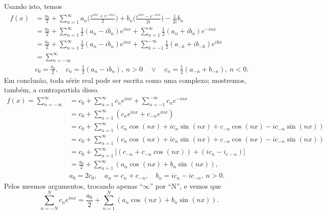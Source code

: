 \documentclass[../pde_notes.tex]{subfiles}
\begin{document}
Usando isto, temos
\begin{align*}
	f(x) & = \frac{a_{0}}{2} + \sum\limits_{n=1}^{\infty}a_{n}\biggl(\frac{e^{inx}+e^{-inx}}{2}\biggr) + b_{n}\biggl(\frac{e^{inx}-e^{-inx}}{2i}\biggr) - \frac{1}{2i}b_{n} \\
	     & = \frac{a_{0}}{2} + \sum\limits_{n=1}^{\infty}\frac{1}{2}(a_{n}-ib_{n})e^{inx} + \sum\limits_{n=1}^{\infty}\frac{1}{2}(a_{n}+ib_{n})e^{-inx}                     \\
	     & = \frac{a_{0}}{2} + \sum\limits_{n=1}^{\infty}\frac{1}{2}(a_{n}-ib_{n})e^{inx} + \sum\limits_{k=-1}^{-\infty}\frac{1}{2}(a_{-k}+ib_{-k})e^{ikx}                  \\
	     & = \sum\limits_{n=-\infty}^{\infty}                                                                                                                               \\
	     & c_{0} = \frac{a_{0}}{2},\quad c_{n} = \frac{1}{2}(a_{n}-ib_{n}),\: n > 0 \quad\vee\quad c_{n}=\frac{1}{2}(a_{-n}+b_{-n}),\:n<0.
\end{align*}
Em conclusão, toda série real pode ser escrita como uma complexo; mostremos, também, a contrapartida disso.
\begin{align*}
	f(x) = \sum\limits_{n=-\infty}^{\infty} & = c_{0}+\sum\limits_{n=1}^{\infty}c_{n}e^{inx}+\sum\limits_{n=-1}^{-\infty}c_{n}e^{-inx}                                     \\
	                                        & = c_{0} + \sum\limits_{n=1}^{\infty}(c_{n}e^{inx}+c_{-n}e^{inx})                                                             \\
	                                        & = c_{0} + \sum\limits_{n=1}^{\infty}(c_{n}\cos^{}{(nx)} + ic_{n}\sin^{}{(nx)} + c_{-n}\cos^{}{(nx)} - i c_{-n}\sin^{}{(nx)}) \\
	                                        & = c_{0} + \sum\limits_{n=1}^{\infty}(c_{n}\cos^{}{(nx)} + ic_{n}\sin^{}{(nx)} + c_{-n}\cos^{}{(nx)} - ic_{-n}\sin^{}{(nx)})  \\
	                                        & = c_{0} + \sum\limits_{n=1}^{\infty}\bigl[(c_{-n}+c_{-n}\cos^{}{(nx)}) + (ic_{n}-i_{c-n})\bigr]                              \\
	                                        & = \frac{a_{0}}{2} + \sum\limits_{n=1}^{\infty}(a_{n}\cos^{}{(nx)}+b_{n}\sin^{}{(nx)}),                                       \\
	                                        & a_{0} = 2c_{0}, \quad a_{n} = c_{n} + c_{-n},\quad b_{n} = ic_{n}-ic_{-n},\: n > 0.
\end{align*}
Pelos mesmos argumentos, trocando apenas ``\(\infty\)'' por ``N'', e vemos que
\[
	\sum\limits_{n=-N}^{N}c_{n}e^{inx} = \frac{a_{0}}{2} + \sum\limits_{n=1}^{N}(a_{n}\cos^{}{(nx)}+b_{n}\sin^{}{(nx)}).
\]
\end{document}
